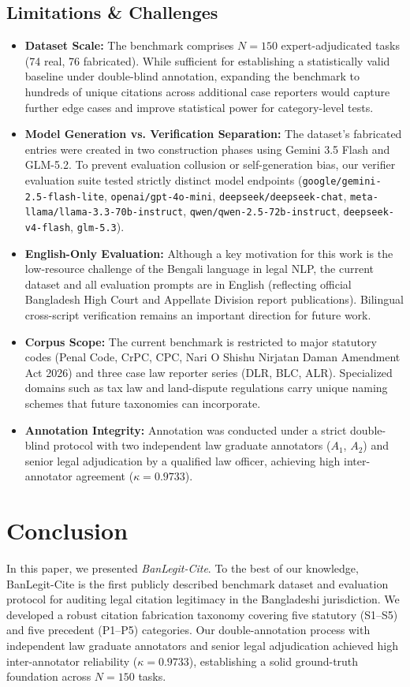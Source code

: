 \documentclass[conference]{IEEEtran}
\begin{document}
\subsection{Limitations \& Challenges}
\begin{itemize}
\item \textbf{Dataset Scale:} The benchmark comprises $N = 150$ expert-adjudicated tasks (74 real, 76 fabricated). While sufficient for establishing a statistically valid baseline under double-blind annotation, expanding the benchmark to hundreds of unique citations across additional case reporters would capture further edge cases and improve statistical power for category-level tests.
\item \textbf{Model Generation vs. Verification Separation:} The dataset's fabricated entries were created in two construction phases using Gemini 3.5 Flash and GLM-5.2. To prevent evaluation collusion or self-generation bias, our verifier evaluation suite tested strictly distinct model endpoints (\texttt{google/gemini-2.5-flash-lite}, \texttt{openai/gpt-4o-mini}, \texttt{deepseek/deepseek-chat}, \texttt{meta-llama/llama-3.3-70b-instruct}, \texttt{qwen/qwen-2.5-72b-instruct}, \texttt{deepseek-v4-flash}, \texttt{glm-5.3}).
\item \textbf{English-Only Evaluation:} Although a key motivation for this work is the low-resource challenge of the Bengali language in legal NLP, the current dataset and all evaluation prompts are in English (reflecting official Bangladesh High Court and Appellate Division report publications). Bilingual cross-script verification remains an important direction for future work.
\item \textbf{Corpus Scope:} The current benchmark is restricted to major statutory codes (Penal Code, CrPC, CPC, Nari O Shishu Nirjatan Daman Amendment Act 2026) and three case law reporter series (DLR, BLC, ALR). Specialized domains such as tax law and land-dispute regulations carry unique naming schemes that future taxonomies can incorporate.
\item \textbf{Annotation Integrity:} Annotation was conducted under a strict double-blind protocol with two independent law graduate annotators ($A_1$, $A_2$) and senior legal adjudication by a qualified law officer, achieving high inter-annotator agreement ($\kappa = 0.9733$).
\end{itemize}

\section{Conclusion}
In this paper, we presented \textit{BanLegit-Cite}. To the best of our knowledge, BanLegit-Cite is the first publicly described benchmark dataset and evaluation protocol for auditing legal citation legitimacy in the Bangladeshi jurisdiction. We developed a robust citation fabrication taxonomy covering five statutory (S1--S5) and five precedent (P1--P5) categories. Our double-annotation process with independent law graduate annotators and senior legal adjudication achieved high inter-annotator reliability ($\kappa = 0.9733$), establishing a solid ground-truth foundation across $N=150$ tasks.
\end{document}
